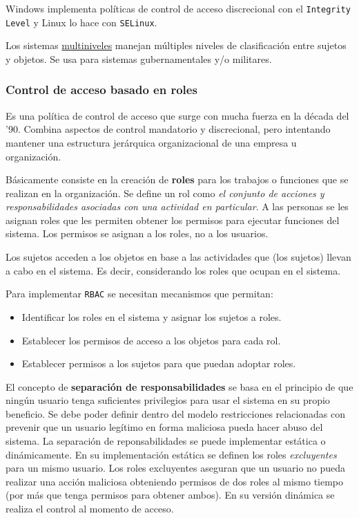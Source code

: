\documentclass[]{article}
\begin{document}
Windows implementa políticas de control de acceso discrecional con el \texttt{Integrity Level} y Linux lo hace con \texttt{SELinux}.

Los sistemas \underline{multiniveles} manejan múltiples niveles de clasificación entre sujetos y objetos. Se usa para sistemas gubernamentales y/o militares.

\subsubsection{Control de acceso basado en roles}
Es una política de control de acceso que surge con mucha fuerza en la década del '90. Combina aspectos de control mandatorio y discrecional, pero intentando mantener una estructura jerárquica organizacional de una empresa u organización.

Básicamente consiste en la creación de \textbf{roles} para los trabajos o funciones que se realizan en la organización. Se define un rol como \emph{el conjunto de acciones y responsabilidades asociadas con una actividad en particular}. A las personas se les asignan roles que les permiten obtener los permisos para ejecutar funciones del sistema. Los permisos se asignan a los roles, no a los usuarios.

Los sujetos acceden a los objetos en base a las actividades que (los sujetos) llevan a cabo en el sistema. Es decir, considerando los roles que ocupan en el sistema.


Para implementar \texttt{RBAC} se necesitan mecanismos que permitan:
\begin{itemize}
	\item Identificar los roles en el sistema y asignar los sujetos a roles.
	\item Establecer los permisos de acceso a los objetos para cada rol.
	\item Establecer permisos a los sujetos para que puedan adoptar roles.
\end{itemize}


El concepto de \textbf{separación de responsabilidades} se basa en el principio de que ningún usuario tenga suficientes privilegios para usar el sistema en su propio beneficio. Se debe poder definir dentro del modelo restricciones relacionadas con prevenir que un usuario legítimo en forma maliciosa pueda hacer abuso del sistema. La separación de reponsabilidades se puede implementar estática o dinámicamente. En su implementación estática se definen los roles \emph{excluyentes} para un mismo usuario. Los roles excluyentes aseguran que un usuario no pueda realizar una acción maliciosa obteniendo permisos de dos roles al mismo tiempo (por más que tenga permisos para obtener ambos). En su versión dinámica se realiza el control al momento de acceso.
\end{document}
